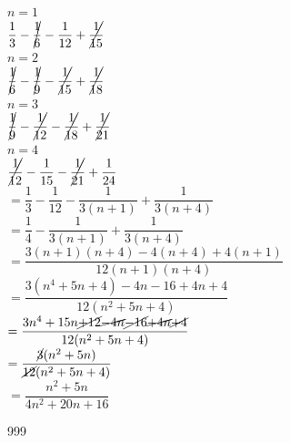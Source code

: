 \documentclass[a4paper]{article}
\begin{document}
$n = 1$\\

$\dfrac{1}{3} - \cancel{\dfrac{1}{6}} - \dfrac{1}{12} + \cancel{\dfrac{1}{15}}$\\

$n = 2$\\

$\cancel{\dfrac{1}{6}} - \cancel{\dfrac{1}{9}} - \cancel{\dfrac{1}{15}} + \cancel{\dfrac{1}{18}}$\\

$n = 3$\\

$\cancel{\dfrac{1}{9}} - \cancel{\dfrac{1}{12}} - \cancel{\dfrac{1}{18}} + \cancel{\dfrac{1}{21}}$\\

$n = 4$\\

$\cancel{\dfrac{1}{12}} - \dfrac{1}{15} - \cancel{\dfrac{1}{21}} + \dfrac{1}{24}$\\

$= \dfrac{1}{3} - \dfrac{1}{12} - \dfrac{1}{3(n + 1)} + \dfrac{1}{3(n + 4)}$ \\ 

$= \dfrac{1}{4} - \dfrac{1}{3(n + 1)} + \dfrac{1}{3(n + 4)}$ \\ 		

$= \dfrac{3(n+1)(n+4)-4(n+4)+4(n+1)}{12(n+1)(n+4)}$ \\

$= \dfrac{3(n^4+5n+4)-4n-16+4n+4}{12(n^2+5n+4)}$ \\

$= \dfrac{3n^4+15n\cancel{+12}\cancel{-4n}\cancel{-16}\cancel{+4n}\cancel{+4}}{12(n^2+5n+4)}$ \\

$= \dfrac{\cancel{3}(n^2+5n)}{\cancel{12}(n^2+5n+4)}$ \\

$= \dfrac{n^2+5n}{4n^2+20n+16}$ \\

\begin{thebibliography}{999}
\end{thebibliography}
\end{document}
